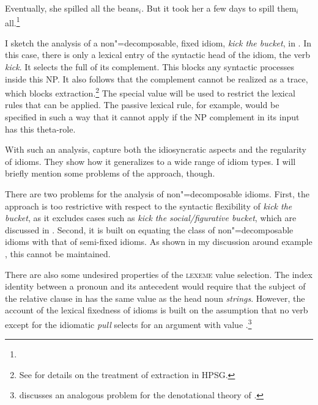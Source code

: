 \documentclass[output=paper,biblatex,babelshorthands,newtxmath,draftmode,colorlinks,citecolor=brown]{langscibook}
\begin{document}
\ea
 \label{ex-pron-spill}
Eventually, she spilled all the beans$_i$. But it took her a few days to spill them$_i$
all.\footnote{
}
\z

\noindent
I sketch the analysis of a non"=decomposable, fixed idiom, \emph{kick the bucket}, in
.  In this case, there is only a lexical entry of the syntactic head of the idiom,
the verb \emph{kick}.  It selects the full  of its complement. This blocks any syntactic
processes inside this NP. It also follows that the complement cannot be realized as a trace, which
blocks extraction.\footnote{See  for
  details on the treatment of extraction in HPSG.}  
%
The special  value  will be used to restrict the lexical rules that can
be applied.  The passive lexical rule, for example, would be specified in such a way that it cannot
apply if the NP complement in its input has this theta-role.


\ea %
\label{ke-kick}
\z 

\noindent
With such an analysis, \citet{KE94a} capture both the idiosyncratic aspects and the regularity of idioms. 
They show how it generalizes to a wide range of idiom types. 
I will briefly mention some problems of the approach, though.

There are two problems for the analysis of non"=decomposable idioms.  First, the approach is too
restrictive with respect to the syntactic flexibility of \emph{kick the bucket}, as it excludes
cases such as \emph{kick the social/figurative bucket}, which are discussed in \citet{Ernst:81}.
Second, it is built on equating the class of non"=decomposable idioms with that of semi-fixed
idioms. As shown in my discussion around example , this cannot be maintained.

\largerpage
There are also some undesired properties of the \textsc{lexeme} value selection. The index identity
between a pronoun and its antecedent would require that the subject of the relative
clause in  has the same  value as the head noun
\emph{strings}. However, the account of the lexical fixedness of idioms is built on the assumption
that no verb except for the idiomatic \emph{pull} selects for an argument with  value
.\footnote{\citet{Pulman:93} discusses an analogous problem for the denotational
  theory of \citet{GKPS85a}.}
\end{document}
